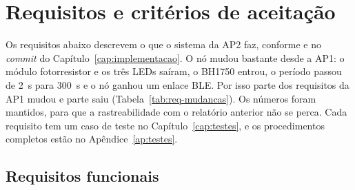 \chapter{Requisitos e critérios de aceitação}
\label{cap:requisitos}
\rubricaRobustez

Os requisitos abaixo descrevem o que o sistema da AP2 faz, conforme
 e  no \emph{commit} do
Capítulo~\ref{cap:implementacao}. O nó mudou bastante desde a AP1: o
módulo fotorresistor e os três LEDs saíram, o BH1750 entrou, o período
passou de \SI{2}{\second} para \SI{300}{\second} e o nó ganhou um enlace
BLE. Por isso parte dos requisitos da AP1 mudou e parte saiu
(Tabela~\ref{tab:req-mudancas}). Os números foram mantidos, para que a
rastreabilidade com o relatório anterior não se perca. Cada requisito
tem um caso de teste no Capítulo~\ref{cap:testes}, e os procedimentos
completos estão no Apêndice~\ref{ap:testes}.

\section{Requisitos funcionais}

